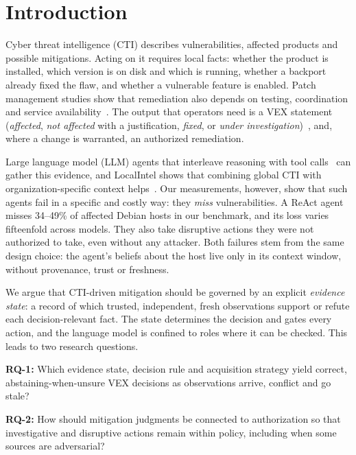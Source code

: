 \documentclass[conference]{IEEEtran}
\begin{document}
\section{Introduction}

Cyber threat intelligence (CTI) describes vulnerabilities, affected products and possible mitigations.
Acting on it requires local facts: whether the product is installed, which version is on disk and which is
running, whether a backport already fixed the flaw, and whether a vulnerable feature is enabled. Patch
management studies show that remediation also depends on testing, coordination and service
availability~\cite{dissanayake2022automation,jenkins2024patching,souppaya2022patchmanagement}. The
output that operators need is a VEX statement (\emph{affected}, \emph{not affected} with a
justification, \emph{fixed}, or \emph{under investigation})~\cite{oasis2022csaf}, and, where a change is
warranted, an authorized remediation.

Large language model (LLM) agents that interleave reasoning with tool
calls~\cite{yao2023react,schick2023toolformer} can gather this evidence, and LocalIntel shows that
combining global CTI with organization-specific context helps~\cite{mitra2024localintel}. Our
measurements, however, show that such agents fail in a specific and costly way: they \emph{miss}
vulnerabilities. A ReAct agent misses 34--49\% of affected Debian hosts in our benchmark, and its loss varies
fifteenfold across models. They also take disruptive actions they were not authorized to
take, even without any attacker. Both failures stem from the same design choice: the agent's beliefs
about the host live only in its context window, without provenance, trust or freshness.

We argue that CTI-driven mitigation should be governed by an explicit \emph{evidence state}: a record of
which trusted, independent, fresh observations support or refute each decision-relevant fact. The state
determines the decision and gates every action, and the language model is confined to roles where it can
be checked. This leads to two research questions.

\textbf{RQ-1:} Which evidence state, decision rule and acquisition strategy yield correct, abstaining-when-unsure
VEX decisions as observations arrive, conflict and go stale?

\textbf{RQ-2:} How should mitigation judgments be connected to authorization so that investigative and
disruptive actions remain within policy, including when some sources are adversarial?
\end{document}

